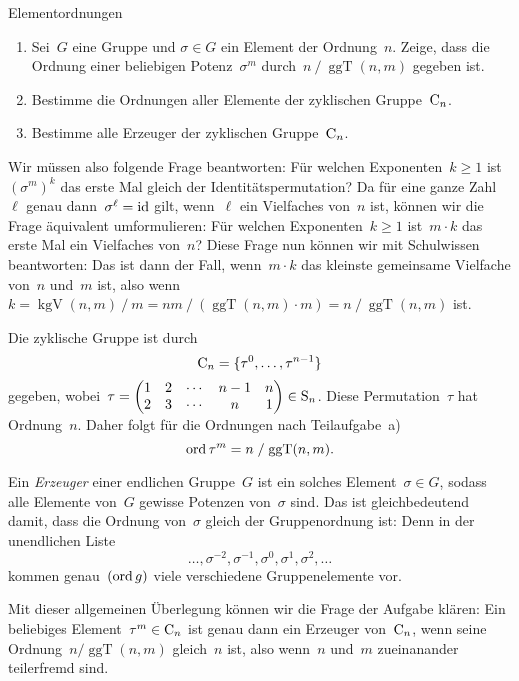 \documentclass{algblatt}
\begin{document}
\begin{aufgabe}{Elementordnungen}
\begin{enumerate}
\item Sei~$G$ eine Gruppe und $\sigma \in G$ ein Element der Ordnung~$n$.
Zeige, dass die Ordnung einer be\-lie\-bi\-gen Potenz~$\sigma^m$ durch~$n \mathrel{/}
\operatorname{ggT}(n,m)$ gegeben ist.

\item Bestimme die Ordnungen aller Elemente der zyklischen Gruppe~$\mathrm{C}_n$.

\item Bestimme alle Erzeuger der zyklischen Gruppe~$\mathrm{C}_n$.
\end{enumerate}

\begin{loesungE}
\item Wir müssen also folgende Frage beantworten: Für welchen Exponenten~$k
\geq 1$ ist~$(\sigma^m)^k$ das erste Mal gleich der Identitätspermutation?
Da für eine ganze Zahl~$\ell$ genau dann~$\sigma^\ell = \mathrm{id}$ gilt, wenn~$\ell$
ein Vielfaches von~$n$ ist, können wir die Frage äquivalent umformulieren: Für
welchen Exponenten~$k \geq 1$ ist~$m \cdot k$ das erste Mal ein Vielfaches
von~$n$? Diese Frage nun können wir mit Schulwissen beantworten: Das ist dann
der Fall, wenn~$m \cdot k$ das kleinste gemeinsame Vielfache von~$n$ und~$m$
ist, also wenn~$k = \operatorname{kgV}(n,m) \mathrel{/} m = nm \mathrel{/}
(\operatorname{ggT}(n,m) \cdot m) = n \mathrel{/}
\operatorname{ggT}(n,m)$ ist.

\item Die zyklische Gruppe ist durch
\[ \mathrm{C}_n = \{ \tau^0, \ldots, \tau^{n-1} \} \]
gegeben, wobei~$\tau =
\begin{pmatrix}1&2&\cdots&n-1&n\\2&3&\cdots&n&1\end{pmatrix} \in \mathrm{S}_n$.
Diese Permutation~$\tau$ hat Ordnung~$n$. Daher
folgt für die Ordnungen nach Teilaufgabe~a)
\[ \operatorname{ord} \tau^m = n \mathrel{/} \operatorname{ggT}(n,m). \]

\item Ein \emph{Erzeuger} einer endlichen Gruppe~$G$ ist ein solches
Element~$\sigma \in G$, sodass alle Elemente von~$G$ gewisse Potenzen
von~$\sigma$ sind. Das ist gleichbedeutend damit, dass die Ordnung von~$\sigma$
gleich der Gruppenordnung ist: Denn in der unendlichen Liste
\[ \ldots, \sigma^{-2}, \sigma^{-1}, \sigma^0, \sigma^1, \sigma^2, \ldots \]
kommen genau~$(\operatorname{ord} g)$ viele verschiedene Gruppenelemente vor.

Mit dieser allgemeinen Überlegung können wir die Frage der Aufgabe klären: Ein
beliebiges Element~$\tau^m \in \mathrm{C}_n$ ist genau dann ein Erzeuger
von~$\mathrm{C}_n$, wenn seine Ordnung~$n / \operatorname{ggT}(n,m)$ gleich~$n$ ist,
also wenn~$n$ und~$m$ zueinanander teilerfremd sind.
\end{loesungE}
\end{aufgabe}
\end{document}
